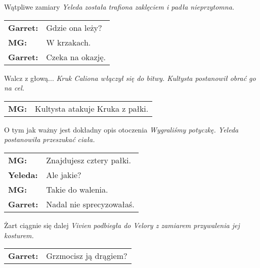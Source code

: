 \documentclass[10pt,twoside,twocolumn]{book}
\begin{document}
\begin{rpg-quotebox}{Wątpliwe zamiary}
   \textit{Yeleda została trafiona zaklęciem i padła nieprzytomna.}\\
   
   \begin{tabularx}{\columnwidth}{lX}
      \textbf{Garret:} & Gdzie ona leży?\\
      \textbf{MG:} & W krzakach.\\
      \textbf{Garret:} & Czeka na okazję.\\
   \end{tabularx}
\end{rpg-quotebox}


\begin{rpg-quotebox}{Walcz z głową...}
   \textit{Kruk Caliona włączył się do bitwy. Kultysta postanowił obrać go na cel.}\\
   
   \begin{tabularx}{\columnwidth}{lX}
      \textbf{MG:} & Kultysta atakuje Kruka z pałki.\\
   \end{tabularx}
\end{rpg-quotebox}


\begin{rpg-quotebox}{O tym jak ważny jest dokładny opis otoczenia}
   \textit{Wygraliśmy potyczkę. Yeleda postanowiła przeszukać ciała.}\\
   
   \begin{tabularx}{\columnwidth}{lX}
      \textbf{MG:} & Znajdujesz cztery pałki.\\
      \textbf{Yeleda:} & Ale jakie?\\
      \textbf{MG:} & Takie do walenia.\\
      \textbf{Garret:} & Nadal nie sprecyzowałaś.\\
   \end{tabularx}
\end{rpg-quotebox}


\begin{rpg-quotebox}{Żart ciągnie się dalej}
   \textit{Vivien podbiegła do Velory z zamiarem przywalenia jej kosturem. }\\
   
   \begin{tabularx}{\columnwidth}{lX}
      \textbf{Garret:} & Grzmocisz ją drągiem?\\
   \end{tabularx}
\end{rpg-quotebox}
\end{document}
